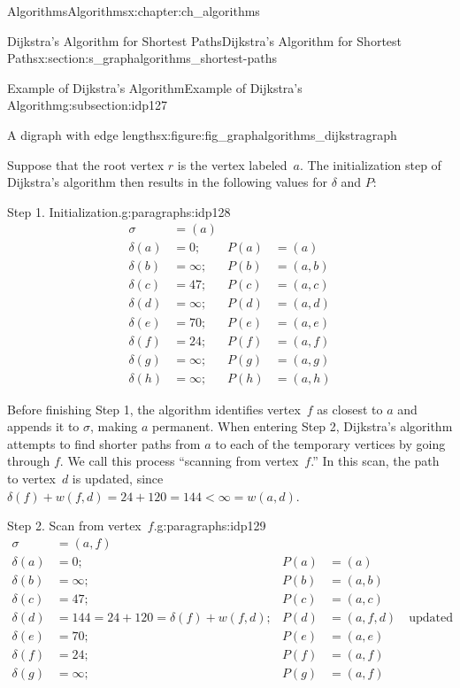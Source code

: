 \documentclass[oneside,10pt,]{book}
\numberwithin{equation}{section}
\newcommand{\lt}{<}
\newcommand{\amp}{&}
\begin{document}
\begin{chapterptx}{Algorithms}{}{Algorithms}{}{}{x:chapter:ch_algorithms}
\begin{sectionptx}{Dijkstra's Algorithm for Shortest Paths}{}{Dijkstra's Algorithm for Shortest Paths}{}{}{x:section:s_graphalgorithms_shortest-paths}
\begin{subsectionptx}{Example of Dijkstra's Algorithm}{}{Example of Dijkstra's Algorithm}{}{}{g:subsection:idp127}
\begin{figureptx}{A digraph with edge lengths}{x:figure:fig_graphalgorithms_dijkstragraph}{}
\begin{image}{0.075}{0.85}{0.075}
\end{image}%
\tcblower
\end{figureptx}%
Suppose that the root vertex \(r\) is the vertex labeled~\(a\). The initialization step of Dijkstra's algorithm then results in the following values for \(\delta\) and \(P\):%
\begin{paragraphs}{Step 1. Initialization.}{g:paragraphs:idp128}%
%
\begin{align*}
\sigma\amp=(a)\amp\amp\\
\delta(a)\amp=0; \amp P(a)\amp=(a)\\
\delta(b) \amp=\infty; \amp P(b)\amp=(a,b)\\
\delta(c) \amp=47; \amp P(c)\amp=(a,c)\\
\delta(d) \amp=\infty; \amp P(d)\amp=(a,d)\\
\delta(e) \amp=70; \amp P(e)\amp=(a,e)\\
\delta(f) \amp=24; \amp P(f)\amp=(a,f)\\
\delta(g) \amp=\infty; \amp P(g)\amp=(a,g)\\
\delta(h) \amp=\infty; \amp P(h)\amp=(a,h)
\end{align*}
%
\par
Before finishing Step 1, the algorithm identifies vertex~\(f\) as closest to \(a\) and appends it to \(\sigma\), making \(a\) permanent. When entering Step 2, Dijkstra's algorithm attempts to find shorter paths from \(a\) to each of the temporary vertices by going through \(f\). We call this process ``scanning from vertex~\(f\).'' In this scan, the path to vertex~\(d\) is updated, since \(\delta(f) + w(f,d)=24+120=144\lt \infty=w(a,d)\).%
\end{paragraphs}%
\begin{paragraphs}{Step 2.  Scan from vertex~\(f\).}{g:paragraphs:idp129}%
%
\begin{align*}
\sigma\amp=(a,f)\amp\amp\\
\delta(a)\amp=0; \amp P(a)\amp=(a)\\
\delta(b)\amp=\infty; \amp P(b)\amp=(a,b)\\
\delta(c)\amp=47; \amp P(c)\amp=(a,c)\\
\delta(d)\amp=144 = 24 + 120 = \delta(f)+w(f,d); \amp P(d)\amp=(a,f,d)\quad\text{updated} \\
\delta(e)\amp=70; \amp P(e)\amp=(a,e)\\
\delta(f)\amp=24; \amp P(f)\amp=(a,f)\\
\delta(g)\amp=\infty; \amp P(g)\amp=(a,f)\\

\end{align*}
\end{paragraphs}
\end{subsectionptx}
\end{sectionptx}
\end{chapterptx}
\end{document}
